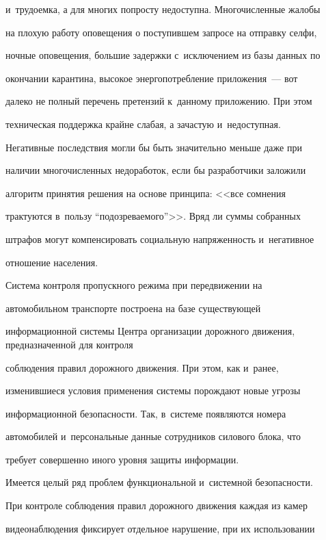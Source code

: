и~трудоемка, а для многих попросту недоступна. Многочисленные жалобы 


на плохую работу оповещения о поступившем запросе на отправку селфи, 


ночные оповещения, большие задержки с~исключением из базы данных по 


окончании карантина, высокое энергопотребление приложения~--- вот 


далеко не полный перечень претензий к~данному приложению. При этом 


техническая поддержка крайне слабая, а зачастую и~недоступная. 


Негативные последствия могли бы быть значительно меньше даже при 


наличии многочисленных недоработок, если бы разработчики заложили 


алгоритм принятия решения на основе принципа: <<все сомнения 


трактуются в~пользу ``подозреваемого''>>. Вряд ли суммы собранных 


штрафов могут компенсировать социальную напряженность и~негативное 


отношение населения. 


   


   Система контроля пропускного режима при передвижении на 


автомобильном транспорте построена на базе существующей 


информационной системы Центра организации дорожного движения, предназначенной для контроля 


соблюдения правил дорожного движения. При этом, как и~ранее, 


изменившиеся условия применения системы порождают новые угрозы 


информационной безопасности. Так, в~системе появляются номера 


автомобилей и~персональные данные сотрудников силового блока, что 


требует совершенно иного уровня защиты информации. 


   


   Имеется целый ряд проблем функциональной и~системной безопасности. 


При контроле соблюдения правил дорожного движения каждая из камер 


видеонаблюдения фиксирует отдельное нарушение, при их использовании 


